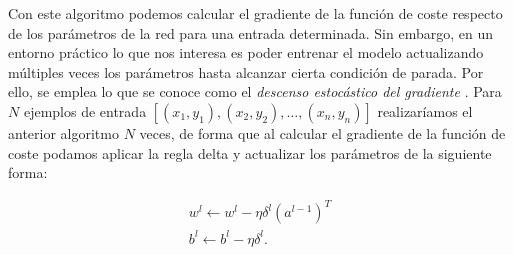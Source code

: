 \begin{appendices}
Con este algoritmo podemos calcular el gradiente de la función de coste respecto de los parámetros de la red para una entrada determinada. Sin embargo, en un entorno práctico lo que nos interesa es poder entrenar el modelo actualizando múltiples veces los parámetros hasta alcanzar cierta condición de parada. Por ello, se emplea lo que se conoce como el \textit{descenso estocástico del gradiente} \cite{dl__goodfellow_2016}. Para $N$ ejemplos de entrada $\left[(x_1,y_1), (x_2,y_2), \dots, (x_n,y_n)\right]$ realizaríamos el anterior algoritmo $N$ veces, de forma que al calcular el gradiente de la función de coste podamos aplicar la regla delta y actualizar los parámetros de la siguiente forma:

\begin{align}\label{f_bp:regla_delta}
	w^l \leftarrow w^l - \eta\delta^l(a^{l-1})^T \\
	b^l \leftarrow b^l - \eta\delta^l.
\end{align}

\end{appendices}
